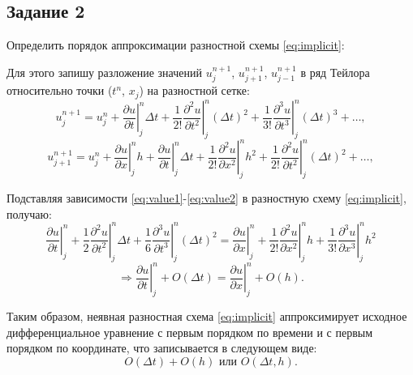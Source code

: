 \documentclass[12pt, a4paper]{report}
\begin{document}
	\subsection*{Задание 2}
	\large
	Определить порядок аппроксимации разностной схемы \eqref{eq:implicit}: \par
	Для этого запишу разложение значений $u_{j}^{n+1}$, $u_{j+1}^{n+1}$, $u_{j-1}^{n+1}$ в ряд Тейлора относительно точки ($t^{n}$, $x_{j}$) на разностной сетке:
	\begin{equation}\label{eq:value1}
	u_{j}^{n+1} = u_{j}^{n} + \left.\frac{\partial u}{\partial t}\right|_{j}^{n}\Delta t + \left.\frac{1}{2!}\frac{\partial^{2} u}{\partial t^{2}}\right|_{j}^{n}(\Delta t)^{2} + \left.\frac{1}{3!}\frac{\partial^{3} u}{\partial t^{3}}\right|_{j}^{n}(\Delta t)^{3} + \dots,
	\end{equation}
	\begin{equation}\label{eq:value2}
		u_{j+1}^{n+1} = u_{j}^{n} + \left.\frac{\partial u}{\partial x}\right|_{j}^{n}h + \left.\frac{\partial u}{\partial t}\right|_{j}^{n}\Delta t + \left.\frac{1}{2!}\frac{\partial^{2} u}{\partial x^{2}}\right|_{j}^{n}h^{2} + \left.\frac{1}{2!}\frac{\partial^{2} u}{\partial t^{2}}\right|_{j}^{n}(\Delta t)^{2} + \dots,
	\end{equation}
	\par
	Подставляя зависимости \eqref{eq:value1}-\eqref{eq:value2} в разностную схему \eqref{eq:implicit}, получаю:
	\begin{equation*}
		\left.\frac{\partial u}{\partial t}\right|_{j}^{n} + \left.\frac{1}{2}\frac{\partial^{2} u}{\partial t^{2}}\right|_{j}^{n}\Delta t + \left.\frac{1}{6}\frac{\partial^{3} u}{\partial t^{3}}\right|_{j}^{n}(\Delta t)^{2} = \left.\frac{\partial u}{\partial x}\right|_{j}^{n} + \left.\frac{1}{2!}\frac{\partial^{2} u}{\partial x^{2}}\right|_{j}^{n}h + \left.\frac{1}{3!}\frac{\partial^{3} u}{\partial x^{3}}\right|_{j}^{n}h^{2}
	\end{equation*}
	\begin{equation*}
		\Rightarrow \left.\frac{\partial u}{\partial t}\right|_{j}^{n} + O(\Delta t) = \left.\frac{\partial u}{\partial x}\right|_{j}^{n} + O(h).
	\end{equation*}
	\par
	Таким образом, неявная разностная схема \eqref{eq:implicit} аппроксимирует исходное дифференциальное уравнение с первым порядком по времени и с первым порядком по координате, что записывается в следующем виде:
	\begin{equation*}
		O(\Delta t) + O(h) \text{ или } O(\Delta t, h).
	\end{equation*}
\end{document}

